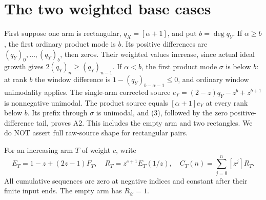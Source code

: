 \documentclass[11pt]{article}
\begin{document}
\section{The two weighted base cases}

\par\medskip

First suppose one arm is rectangular, $q_X=[\alpha+1]$, and put
$b=\deg q_Y$. If $\alpha\ge b$, the first ordinary product mode is
$b$. Its positive differences are $(q_Y)_0,\ldots,(q_Y)_b$, then
zeros. Their weighted values increase, since actual ideal growth
gives $2(q_Y)_n\ge(q_Y)_{n-1}$. If $\alpha<b$, the first product
mode $\sigma$ is below $b$: at rank $b$ the window difference is
$1-(q_Y)_{b-\alpha-1}\le0$, and ordinary window unimodality applies.
The single-arm corrected source
$e_Y=(2-z)q_Y-z^b+z^{b+1}$ is nonnegative unimodal.
The product source equals $[\alpha+1]e_Y$ at every rank below $b$.
Its prefix through $\sigma$ is unimodal, and (3), followed by the
zero positive-difference tail, proves A2. This includes the empty
arm and two rectangles. We do NOT assert full raw-source shape
for rectangular pairs.

\par\medskip

For an increasing arm $T$ of weight $c$, write
\[
 E_T=1-z+(2z-1)F_T,\quad R_T=z^{c+1}E_T(1/z),\quad
 C_T(n)=\sum_{j=0}^n[z^j]R_T.
\]
All cumulative sequences are zero at negative indices and constant
after their finite input ends. The empty arm has $R_\varnothing=1$.
\end{document}
